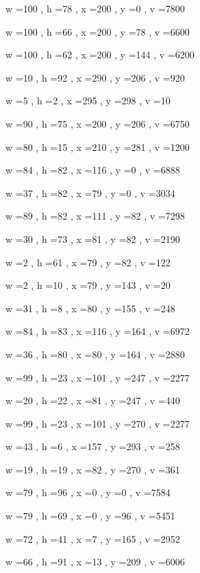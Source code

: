 \documentclass[11pt]{article}
\begin{document}
w =100 , h =78 , x =200 , y =0 , v =7800
\par
w =100 , h =66 , x =200 , y =78 , v =6600
\par
w =100 , h =62 , x =200 , y =144 , v =6200
\par
w =10 , h =92 , x =290 , y =206 , v =920
\par
w =5 , h =2 , x =295 , y =298 , v =10
\par
w =90 , h =75 , x =200 , y =206 , v =6750
\par
w =80 , h =15 , x =210 , y =281 , v =1200
\par
w =84 , h =82 , x =116 , y =0 , v =6888
\par
w =37 , h =82 , x =79 , y =0 , v =3034
\par
w =89 , h =82 , x =111 , y =82 , v =7298
\par
w =30 , h =73 , x =81 , y =82 , v =2190
\par
w =2 , h =61 , x =79 , y =82 , v =122
\par
w =2 , h =10 , x =79 , y =143 , v =20
\par
w =31 , h =8 , x =80 , y =155 , v =248
\par
w =84 , h =83 , x =116 , y =164 , v =6972
\par
w =36 , h =80 , x =80 , y =164 , v =2880
\par
w =99 , h =23 , x =101 , y =247 , v =2277
\par
w =20 , h =22 , x =81 , y =247 , v =440
\par
w =99 , h =23 , x =101 , y =270 , v =2277
\par
w =43 , h =6 , x =157 , y =293 , v =258
\par
w =19 , h =19 , x =82 , y =270 , v =361
\par
w =79 , h =96 , x =0 , y =0 , v =7584
\par
w =79 , h =69 , x =0 , y =96 , v =5451
\par
w =72 , h =41 , x =7 , y =165 , v =2952
\par
w =66 , h =91 , x =13 , y =209 , v =6006
\par
\newpage
\end{document}
